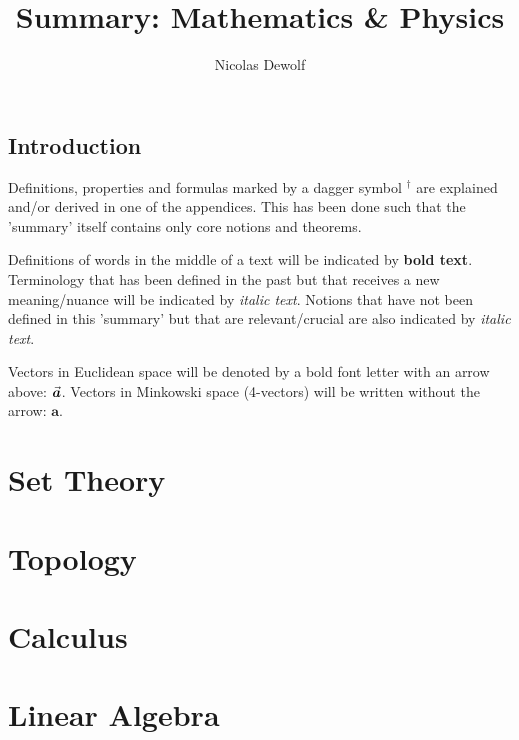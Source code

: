 \documentclass[12pt]{report}
\begin{document}
\reversemarginpar
\setcounter{tocdepth}{2}

\title{Summary: Mathematics \& Physics}
\author{Nicolas Dewolf}
\maketitle

\tableofcontents

\chapter{Introduction}
Definitions, properties and formulas marked by a dagger symbol $^\dag$ are explained and/or derived in one of the appendices. This has been done such that the 'summary' itself contains only core notions and theorems.

Definitions of words in the middle of a text will be indicated by \textbf{bold text}. Terminology that has been defined in the past but that receives a new meaning/nuance will be indicated by \textit{italic text}. Notions that have not been defined in this 'summary' but that are relevant/crucial are also indicated by \textit{italic text}.

Vectors in Euclidean space will be denoted by a bold font letter with an arrow above: $\vec{\boldsymbol{a}}$. Vectors in Minkowski space (4-vectors) will be written without the arrow: $\mathbf{a}$.

\part{Set Theory}


\part{Topology}



\part{Calculus}





%
%
%

\part{Linear Algebra}






\end{document}
